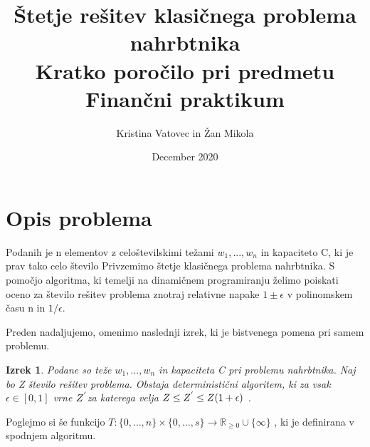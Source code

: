 \documentclass[a4paper,15pt]{article}
\title{ \textbf{ Štetje rešitev klasičnega problema nahrbtnika} \\
  \large Kratko poročilo pri predmetu Finančni praktikum}
\author{Kristina Vatovec in Žan Mikola}
\date{December 2020}
\newtheorem{theorem}{Izrek}
\begin{document}
\begin{titlepage}
\maketitle
\thispagestyle{empty}
\pagestyle{empty}
\end{titlepage}


\section{Opis problema}


Podanih je n elementov  z celoštevilskimi težami \(w_{1},...,w_{n}\) in kapaciteto C, ki je prav tako celo število  Privzemimo štetje klasičnega problema nahrbtnika.
S pomočjo algoritma, ki temelji na dinamičnem programiranju želimo poiskati oceno za  število rešitev problema znotraj relativne napake \(1 \pm \epsilon\)  v polinomskem času n in \(1/\epsilon\).
 
\vspace{3mm}
\noindent Preden nadaljujemo, omenimo naslednji izrek, ki je bistvenega pomena pri samem problemu.

\begin{theorem} 
Podane so teže \(w_{1},...,w_{n}\) in kapaciteta C pri problemu nahrbtnika. Naj bo Z število rešitev problema. Obstaja deterministični algoritem, ki za vsak \( \epsilon \in [0,1]\) vrne \(\uppercase{z}^{'} \)za katerega velja  
\( \uppercase{z} \leq \uppercase{z}^{'} \leq \uppercase{z}(1 + \epsilon) \) .

\end{theorem}


\noindent Poglejmo si še funkcijo $T : \{0, \ldots, n\} \times \{0, \ldots, s\} \rightarrow \mathbb{R}_{\geq 0} \cup \{\infty \}  $ , ki je definirana v spodnjem algoritmu.
\end{document}
